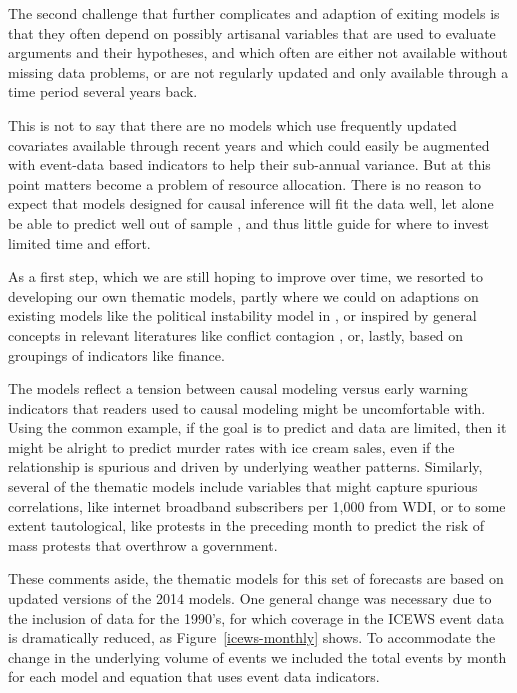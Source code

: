 \documentclass[pdftex,11pt]{article}
\begin{document}
The second challenge that further complicates and adaption of exiting models is that they often depend on possibly artisanal variables that are used to evaluate arguments and their hypotheses, and which often are either not available without missing data problems, or are not regularly updated and only available through a time period several years back. 

This is not to say that there are no models which use frequently updated covariates available through recent years and which could easily be augmented with event-data based indicators to help their sub-annual variance. But at this point matters become a problem of resource allocation. There is no reason to expect that models designed for causal inference will fit the data well, let alone be able to predict well out of sample \citep{ward:greenhill:bakke:2010}, and thus little guide for where to invest limited time and effort. 

As a first step, which we are still hoping to improve over time, we resorted to developing our own thematic models, partly where we could on adaptions on existing models like the political instability model in \citet{goldstone:bates:etal:2010}, or inspired by general concepts in relevant literatures like conflict contagion \citep[e.g.][]{buhaug:gleditsch:2008}, or, lastly, based on groupings of indicators like finance. 

The models reflect a tension between causal modeling versus early warning indicators that readers used to causal modeling might be uncomfortable with. Using the common example, if the goal is to predict and data are limited, then it might be alright to predict murder rates with ice cream sales, even if the relationship is spurious and driven by underlying weather patterns. Similarly, several of the thematic models include variables that might capture spurious correlations, like internet broadband subscribers per 1,000 from WDI, or to some extent tautological, like protests in the preceding month to predict the risk of mass protests that overthrow a government. 

These comments aside, the thematic models for this set of forecasts are based on updated versions of the 2014 models. One general change was necessary due to the inclusion of data for the 1990's, for which coverage in the ICEWS event data is dramatically reduced, as Figure~\ref{icews-monthly} shows. To accommodate the change in the underlying volume of events we included the total events by month for each model and equation that uses event data indicators. 
\end{document}
